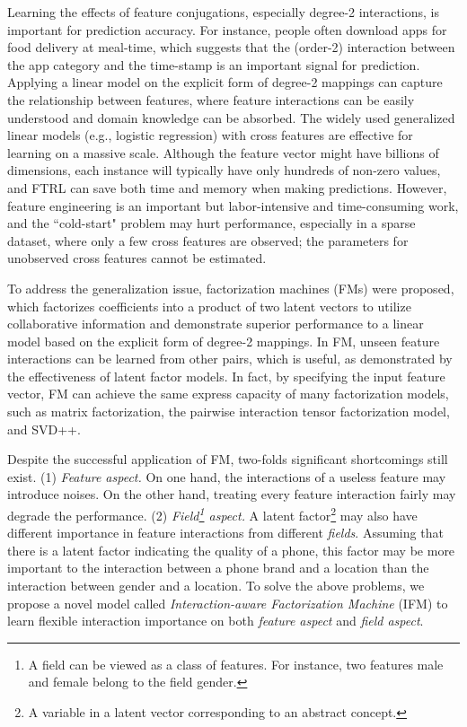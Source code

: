\documentclass[letterpaper]{article} \usepackage{aaai19}  \usepackage{times}  \usepackage{helvet}  \usepackage{courier}  \usepackage{url}  \usepackage{graphicx}  \frenchspacing  \setlength{\pdfpagewidth}{8.5in}  \setlength{\pdfpageheight}{11in}  \usepackage{mathtools}
\begin{document}
Learning the effects of feature conjugations, especially degree-2 interactions, is important for prediction accuracy\cite{chang2010training}. For instance, people often download apps for food delivery at meal-time, which suggests that the (order-2) interaction between the app category and the time-stamp is an important signal for prediction\cite{guo2017deepfm}. Applying a linear model on the explicit form of degree-2 mappings
can capture the relationship between features, where feature interactions can be easily understood and domain knowledge can be absorbed. The widely used generalized linear models (e.g., logistic regression) with cross features are effective for learning on a massive scale. Although the feature vector might have billions of dimensions, each instance will typically have only hundreds of non-zero values, and  FTRL\cite{mcmahan2013ad} can save both time and memory when making predictions. However, feature engineering is an important but labor-intensive and time-consuming work, and the ``cold-start" problem may hurt performance, especially in a sparse dataset, where only a few cross features are observed; the parameters for unobserved cross features cannot be estimated. 

To address the generalization issue, factorization machines (FMs)\cite{rendle2010factorization} were proposed, which factorizes coefficients into a product of two latent vectors to utilize collaborative information and demonstrate superior performance to a linear model based on the explicit form of degree-2 mappings. In FM, unseen feature interactions can be learned from other pairs, which is useful, as demonstrated by the effectiveness of latent factor models\cite{chen2014context,hong2016latent}. In fact, by specifying the input feature vector, FM can achieve the same express capacity of many factorization models, such as matrix factorization, the pairwise interaction tensor factorization model\cite{rendle2010pairwise}, and SVD++\cite{koren2008factorization}.

Despite the successful application of FM, two-folds significant shortcomings still exist. (1) \emph{Feature aspect.} On one hand, the interactions of a useless feature may introduce noises. On the other hand, treating every feature interaction fairly may degrade the performance. (2) \emph{Field\footnote{A field can be viewed as a class of features. For instance, two features male and female belong to the field gender.} aspect.} A latent factor\footnote{A variable in a latent vector corresponding to an abstract concept.} may also have different importance in feature interactions from different \emph{fields}. 
Assuming that there is a latent factor indicating the quality of a phone, this factor may be more important to the interaction between a phone brand and a location than the interaction between gender and a location. To solve the above problems, we propose a novel model called \emph{Interaction-aware Factorization Machine} (IFM) to learn flexible interaction importance on both \emph{feature aspect} and \emph{field aspect}.
\end{document}
